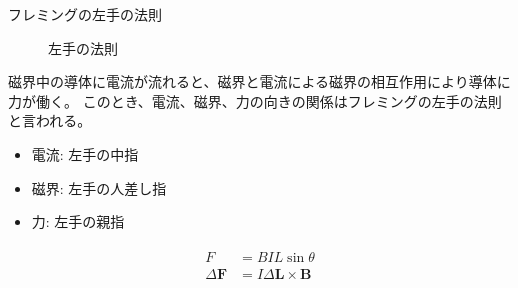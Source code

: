 \begin{multicols}{3}
\begin{itembox}[l]{フレミングの左手の法則}
\begin{figure}[H]
\begin{minipage}[t]{0.48\linewidth}
                    \caption{左手の法則}
                    \label{fig:left_hand}
                \end{minipage}
            \end{figure}
            磁界中の導体に電流が流れると、磁界と電流による磁界の相互作用により導体に力が働く。
            このとき、電流、磁界、力の向きの関係はフレミングの左手の法則と言われる。
            \begin{itemize}
                \item 電流: 左手の中指
                \item 磁界: 左手の人差し指
                \item 力: 左手の親指
            \end{itemize}
            \begin{align}
                \begin{split}
                    F &= BIL\sin\theta\\
                    \varDelta \bm{F}&= I\varDelta \bm{L} \times \bm{B}
                \end{split}
            \end{align}
        \end{itembox}
    \end{multicols}
